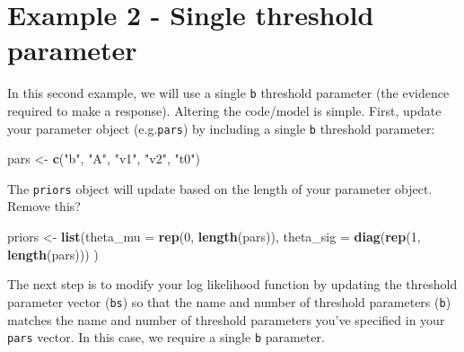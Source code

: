 \documentclass[]{book}
\newenvironment{Shaded}{\begin{snugshade}}{\end{snugshade}}
\newcommand{\DataTypeTok}[1]{\textcolor[rgb]{0.13,0.29,0.53}{#1}}
\newcommand{\DecValTok}[1]{\textcolor[rgb]{0.00,0.00,0.81}{#1}}
\newcommand{\KeywordTok}[1]{\textcolor[rgb]{0.13,0.29,0.53}{\textbf{#1}}}
\newcommand{\NormalTok}[1]{#1}
\newcommand{\OperatorTok}[1]{\textcolor[rgb]{0.81,0.36,0.00}{\textbf{#1}}}
\newcommand{\StringTok}[1]{\textcolor[rgb]{0.31,0.60,0.02}{#1}}
\begin{document}
\hypertarget{example-2---single-threshold-parameter}{%
\chapter{Example 2 - Single threshold parameter}\label{example-2---single-threshold-parameter}}

In this second example, we will use a single \texttt{b} threshold parameter (the evidence required to make a response).
Altering the code/model is simple. First, update your parameter object (e.g.\texttt{pars}) by including a single \texttt{b} threshold parameter:

\begin{Shaded}
\begin{Highlighting}[]
\NormalTok{pars <-}\StringTok{ }\KeywordTok{c}\NormalTok{(}\StringTok{"b"}\NormalTok{, }\StringTok{"A"}\NormalTok{, }\StringTok{"v1"}\NormalTok{, }\StringTok{"v2"}\NormalTok{, }\StringTok{"t0"}\NormalTok{)}
\end{Highlighting}
\end{Shaded}

The \texttt{priors} object will update based on the length of your parameter object. Remove this?

\begin{Shaded}
\begin{Highlighting}[]
\NormalTok{priors <-}\StringTok{ }\KeywordTok{list}\NormalTok{(}\DataTypeTok{theta_mu =} \KeywordTok{rep}\NormalTok{(}\DecValTok{0}\NormalTok{, }\KeywordTok{length}\NormalTok{(pars)),}
  \DataTypeTok{theta_sig =} \KeywordTok{diag}\NormalTok{(}\KeywordTok{rep}\NormalTok{(}\DecValTok{1}\NormalTok{, }\KeywordTok{length}\NormalTok{(pars)))}
\NormalTok{)}
\end{Highlighting}
\end{Shaded}

The next step is to modify your log likelihood function by updating the threshold parameter vector (\texttt{bs}) so that the name and number of threshold parameters (\texttt{b}) matches the name and number of threshold parameters you've specified in your \texttt{pars} vector. In this case, we require a single \texttt{b} parameter.

\begin{Shaded}
\end{Shaded}
\end{document}
